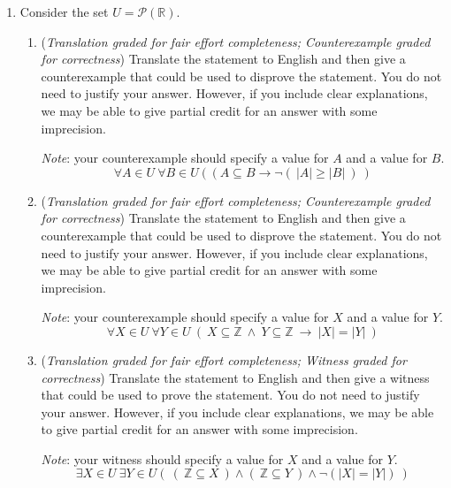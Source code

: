 \documentclass[12pt, oneside]{article}
\begin{document}
\begin{enumerate}
    \item Consider the set $U = \mathcal{P}(\mathbb{R})$. 
    
    \begin{enumerate}
        \item ({\it Translation graded for fair effort completeness; Counterexample graded 
        for correctness})  Translate the statement to English and then give a counterexample 
        that could be used to disprove the statement. You do not need to justify your answer.  
        However, if you include clear explanations, 
        we may be able to give partial credit for an answer with some imprecision.

        {\it Note}: your counterexample should specify a value for $A$ and a value for $B$.
        \[
            \forall A \in U ~\forall B \in U~(~( A \subseteq B \to \lnot (~|A| \geq |B|~)~)
        \]
        \item ({\it Translation graded for fair effort completeness; Counterexample graded 
        for correctness})  Translate the statement to English and then give a counterexample 
        that could be used to disprove the statement. You do not need to justify your answer.  
        However, if you include clear explanations, 
        we may be able to give partial credit for an answer with some imprecision.

        {\it Note}: your counterexample should specify a value for $X$ and a value for $Y$.
        \[
            \forall X \in U~\forall Y \in U~( ~X \subseteq \mathbb{Z}~\land~ Y \subseteq \mathbb{Z} ~\to~  |X|  = |Y| ~)
        \]
        \item ({\it Translation graded for fair effort completeness; Witness graded 
        for correctness})  Translate the statement to English and then give a witness 
        that could be used to prove the statement. You do not need to justify your answer.  
        However, if you include clear explanations, 
        we may be able to give partial credit for an answer with some imprecision.

        {\it Note}: your witness should specify a value for $X$ and a value for $Y$.
        \[
            \exists X \in U~ \exists Y \in U (~(~\mathbb{Z} \subseteq X~) \land
            (~\mathbb{Z} \subseteq Y~) \land \neg ( |X| = |Y|)~)
        \]
    \end{enumerate}


\end{enumerate}
\end{document}
